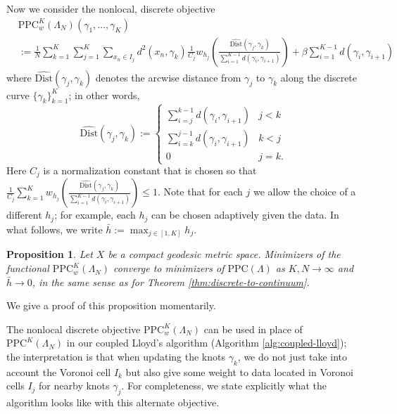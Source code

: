 \documentclass[aos, preprint]{imsart}
\theoremstyle{plain}
\newtheorem{prop}[theorem]{Proposition}
\theoremstyle{remark}
\begin{document}
\begin{appendix}
Now we consider the nonlocal, discrete objective
\begin{align*}
&\text{PPC}_{w}^{K}(\Lambda_{N}) (\gamma_1, ..., \gamma_K)\\
&:=\frac{1}{N}\sum_{k=1}^{K}\sum_{j=1}^{K}\sum_{x_{n}\in I_{j}}d^{2}(x_{n},\gamma_{k})\frac{1}{C_{j}}w_{h_{j}}\left(\frac{\widehat{\text{Dist}}(\gamma_{j},\gamma_{k})}{\sum_{i=1}^{K-1}d(\gamma_{i},\gamma_{i+1})}\right)+\beta\sum_{i=1}^{K-1}d(\gamma_{i},\gamma_{i+1})
\end{align*}
where $\widehat{\text{Dist}}(\gamma_{j},\gamma_{k})$ denotes the
arcwise distance from $\gamma_{j}$ to $\gamma_{k}$ along the discrete
curve $\{\gamma_{k}\}_{k=1}^{K}$; in other words,
\[
\widehat{\text{Dist}}(\gamma_{j},\gamma_{k}):=\begin{cases}
\sum_{i=j}^{k-1}d(\gamma_{i},\gamma_{i+1}) & j<k\\
\sum_{i=k}^{j-1}d(\gamma_{i},\gamma_{i+1}) & k<j\\
0 & j=k.
\end{cases}
\]
Here $C_{j}$ is a normalization constant that is chosen so that $\frac{1}{C_{j}}\sum_{k=1}^{K}w_{h_{j}}\left(\frac{\widehat{\text{Dist}}(\gamma_{j},\gamma_{k})}{\sum_{i=1}^{K-1}d(\gamma_{i},\gamma_{i+1})}\right) \leq 1$.
Note that for each $j$ we allow the choice of a different $h_{j}$;
for example, each $h_{j}$ can be chosen adaptively given the data.
In what follows, we write $\bar{h}:=\max_{j\in[1,K]}h_{j}$.




\begin{prop}
\label{prop:discrete-nonlocal-to-continuum}
Let $X$ be a compact geodesic metric space. Minimizers of the functional
$\text{PPC}_{w}^{K}(\Lambda_{N})$ converge to minimizers of $\text{PPC}(\Lambda)$
as $K,N\rightarrow\infty$ and $\bar{h}\rightarrow0$, in the same
sense as for Theorem \ref{thm:discrete-to-continuum}.
\end{prop}

We give a proof of this proposition momentarily.

The nonlocal discrete objective $\text{PPC}_w^K(\Lambda_N)$ can be used in place of $\text{PPC}^K(\Lambda_N)$ in our coupled Lloyd's algorithm (Algorithm \ref{alg:coupled-lloyd}); the interpretation is that when updating the knots $\gamma_k$, we do not just take into account the Voronoi cell $I_k$ but also give some weight to data located in Voronoi cells $I_j$ for nearby knots $\gamma_j$. For completeness, we state explicitly what the algorithm looks like with this alternate objective.


\end{appendix}
\end{document}

